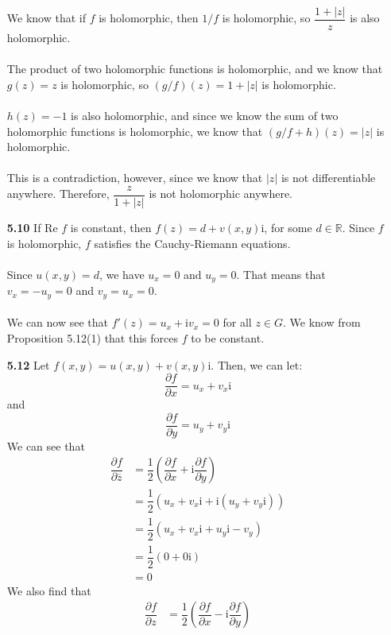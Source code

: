 \begin{enumerate}
We know that if $f$ is holomorphic, then $1/f$ is holomorphic, so $\dfrac{1+|z|}{z}$ is also holomorphic. \\\\
The product of two holomorphic functions is holomorphic, and we know that $g(z) = z$ is holomorphic, so $(g/f)(z) = 1+|z|$ is holomorphic. \\\\
$h(z) = -1$ is also holomorphic, and since we know the sum of two holomorphic functions is holomorphic, we know that $(g/f+h)(z) = |z|$ is holomorphic. \\\\
This is a contradiction, however, since we know that $|z|$ is not differentiable anywhere. Therefore, $\dfrac{z}{1+|z|}$ is not holomorphic anywhere.
\item[\textbf{5.10}] 
If Re $f$ is constant, then $f(z) = d + v(x,y)\mathrm{i}$, for some $d \in \mathbb{R}$. Since $f$ is holomorphic, $f$ satisfies the Cauchy-Riemann equations. \\\\
Since $u(x,y) = d$, we have $u_x = 0$ and $u_y = 0$. That means that $v_x = -u_y = 0$ and $v_y = u_x = 0$. \\\\
We can now see that $f'(z) = u_x + \mathrm{i}v_x = 0$ for all $z \in G$. We know from Proposition 5.12(1) that this forces $f$ to be constant.
\item[\textbf{5.12}] 
Let $f(x,y) = u(x,y) + v(x,y)\mathrm{i}$. Then, we can let: \\
\[\dfrac{\partial f}{\partial x} = u_x + v_x\mathrm{i}\]
and 
\[\dfrac{\partial f}{\partial y} = u_y + v_y\mathrm{i}\]
We can see that 
\begin{align*}
\dfrac{\partial f}{\partial \overline{z}}
&= \dfrac{1}{2}\left(\dfrac{\partial f}{\partial x}+\mathrm{i}\dfrac{\partial f}{\partial y}\right) \\
&= \dfrac{1}{2}\left(u_x + v_x\mathrm{i} + \mathrm{i}(u_y + v_y\mathrm{i})\right) \\
&= \dfrac{1}{2}\left(u_x + v_x\mathrm{i} + u_y\mathrm{i} - v_y\right) \\
&= \dfrac{1}{2}\left(0 + 0\mathrm{i}\right) \\
&= 0
\end{align*}
We also find that
\begin{align*}
\dfrac{\partial f}{\partial z}
&= \dfrac{1}{2}\left(\dfrac{\partial f}{\partial x}-\mathrm{i}\dfrac{\partial f}{\partial y}\right) \\

\end{align*}
\end{enumerate}

